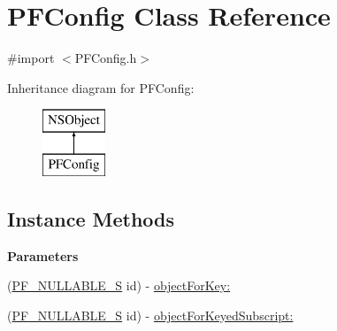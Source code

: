 \hypertarget{interface_p_f_config}{}\section{P\+F\+Config Class Reference}
\label{interface_p_f_config}


{\ttfamily \#import $<$P\+F\+Config.\+h$>$}

Inheritance diagram for P\+F\+Config\+:\begin{figure}[H]
\begin{center}
\leavevmode
\includegraphics[height=2.000000cm]{interface_p_f_config}
\end{center}
\end{figure}
\subsection*{Instance Methods}
\begin{Indent}{\bf Parameters}\par
{\em 

 

 }\begin{DoxyCompactItemize}
\item 
(\hyperlink{_p_f_nullability_8h_ada31c80e56a25740ae808dccdacc9f1a}{P\+F\+\_\+\+N\+U\+L\+L\+A\+B\+L\+E\+\_\+\+S} id) -\/ \hyperlink{interface_p_f_config_a73f608dbd56a04f83e13c91cec1e91f9}{object\+For\+Key\+:}
\item 
(\hyperlink{_p_f_nullability_8h_ada31c80e56a25740ae808dccdacc9f1a}{P\+F\+\_\+\+N\+U\+L\+L\+A\+B\+L\+E\+\_\+\+S} id) -\/ \hyperlink{interface_p_f_config_aef854289ad2a7cc221d2edf52c4988c6}{object\+For\+Keyed\+Subscript\+:}
\end{DoxyCompactItemize}
\end{Indent}
